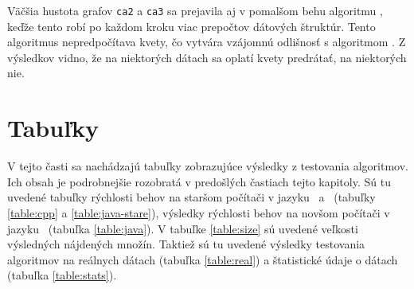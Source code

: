 Väčšia hustota grafov \texttt{ca2} a \texttt{ca3} sa prejavila aj v pomalšom 
behu algoritmu , keďže tento robí po každom kroku viac prepočtov 
dátových štruktúr. Tento algoritmus nepredpočítava kvety, čo vytvára vzájomnú 
odlišnosť s algoritmom . Z výsledkov vidno, že na niektorých dátach 
sa oplatí kvety predrátať, na niektorých nie.

\section{Tabuľky}

V tejto časti sa nachádzajú tabuľky zobrazujúce výsledky z testovania 
algoritmov. Ich obsah je podrobnejšie rozobratá v predošlých častiach tejto 
kapitoly. Sú tu uvedené tabuľky rýchlosti behov na staršom počítači v jazyku 
\cpp\ a \Java\ (tabuľky \ref{table:cpp} a \ref{table:java-stare}), výsledky 
rýchlosti behov na novšom počítači v jazyku \Java\ (tabuľka \ref{table:java}). 
V tabuľke \ref{table:size} sú uvedené veľkosti výsledných nájdených množín.
Taktiež sú tu uvedené výsledky testovania algoritmov na reálnych dátach 
(tabuľka \ref{table:real}) a štatistické údaje o dátach (tabuľka 
\ref{table:stats}).

